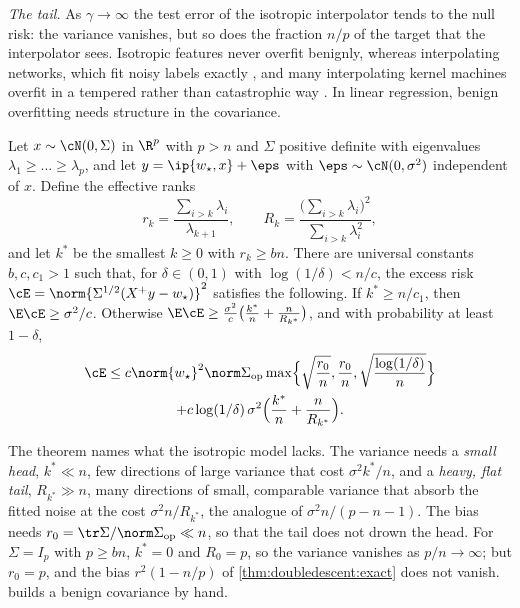 \begin{refsection}
\emph{The tail.} As $\gamma\to\infty$ the test error of the isotropic interpolator tends to the null risk: the variance vanishes, but so does the fraction $n/p$ of the target that the interpolator sees. Isotropic features never overfit benignly, whereas interpolating networks, which fit noisy labels exactly \parencite{ZhangEtAl2017}, and many interpolating kernel machines overfit in a tempered rather than catastrophic way \parencite{MallinarEtAl2022}. In linear regression, benign overfitting needs structure in the covariance.

\begin{theorem}\label{thm:doubledescent:bllt}
Let $x\sim\cN(0,\Sigma)$ in $\R^p$ with $p>n$ and $\Sigma$ positive definite with eigenvalues $\lambda_1\ge\dots\ge\lambda_p$, and let $y=\ip{w_\star,x}+\eps$ with $\eps\sim\cN(0,\sigma^2)$ independent of $x$. Define the effective ranks
\[
  r_k=\frac{\sum_{i>k}\lambda_i}{\lambda_{k+1}},\qquad R_k=\frac{\bigl(\sum_{i>k}\lambda_i\bigr)^2}{\sum_{i>k}\lambda_i^2},
\]
and let $k^*$ be the smallest $k\ge0$ with $r_k\ge bn$. There are universal constants $b,c,c_1>1$ such that, for $\delta\in(0,1)$ with $\log(1/\delta)<n/c$, the excess risk $\cE=\norm{\Sigma^{1/2}(X^+y-w_\star)}^2$ satisfies the following. If $k^*\ge n/c_1$, then $\E\cE\ge\sigma^2/c$. Otherwise $\E\cE\ge\frac{\sigma^2}c\bigl(\frac{k^*}n+\frac n{R_{k^*}}\bigr)$, and with probability at least $1-\delta$,
\begin{multline*}
  \cE\le c\norm{w_\star}^2\norm\Sigma_{\op}\max\Bigl\{\sqrt{\frac{r_0}n},\frac{r_0}n,\sqrt{\frac{\log(1/\delta)}n}\Bigr\}\\
  +c\log(1/\delta)\,\sigma^2\Bigl(\frac{k^*}n+\frac n{R_{k^*}}\Bigr).
\end{multline*}
\end{theorem}

The theorem names what the isotropic model lacks. The variance needs a \emph{small head}, $k^*\ll n$, few directions of large variance that cost $\sigma^2k^*/n$, and a \emph{heavy, flat tail}, $R_{k^*}\gg n$, many directions of small, comparable variance that absorb the fitted noise at the cost $\sigma^2n/R_{k^*}$, the analogue of $\sigma^2n/(p-n-1)$. The bias needs $r_0=\tr\Sigma/\norm\Sigma_{\op}\ll n$, so that the tail does not drown the head. For $\Sigma=I_p$ with $p\ge bn$, $k^*=0$ and $R_0=p$, so the variance vanishes as $p/n\to\infty$; but $r_0=p$, and the bias $r^2(1-n/p)$ of \cref{thm:doubledescent:exact} does not vanish.  builds a benign covariance by hand.


\end{refsection}
